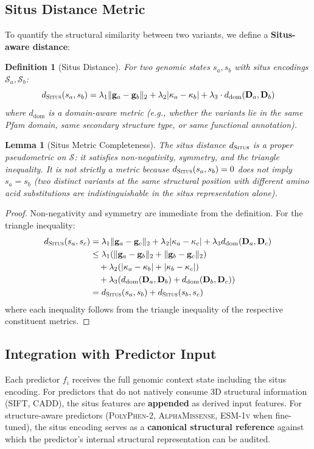 \documentclass[11pt,a4paper]{article}
\newtheorem{lemma}[theorem]{Lemma}
\newtheorem{definition}[theorem]{Definition}
\theoremstyle{definition}
\newcommand{\calS}{\mathcal{S}}
\newcommand{\situs}{\textsc{Situs}}
\newcommand{\SIFT}{\textsc{SIFT}}
\newcommand{\PolyPhen}{\textsc{PolyPhen-2}}
\newcommand{\CADD}{\textsc{CADD}}
\newcommand{\AlphaMissense}{\textsc{AlphaMissense}}
\newcommand{\ESM}{\textsc{ESM-1v}}
\newcommand{\situsenc}{\mathcal{S}}
\begin{document}
\subsection{Situs Distance Metric}
To quantify the structural similarity between two variants, we define a \textbf{Situs-aware distance}:
\begin{definition}[Situs Distance]
For two genomic states $s_a, s_b$ with situs encodings $\situsenc_a, \situsenc_b$:
\begin{equation}
    d_{\situs}(s_a, s_b) = \lambda_1 \|\mathbf{g}_a - \mathbf{g}_b\|_2 + \lambda_2 |\kappa_a - \kappa_b| + \lambda_3 \cdot d_{\text{dom}}(\mathbf{D}_a, \mathbf{D}_b)
\end{equation}
where $d_{\text{dom}}$ is a domain-aware metric (e.g., whether the variants lie in the same Pfam domain, same secondary structure type, or same functional annotation).
\end{definition}
\begin{lemma}[Situs Metric Completeness]
\label{lem:situs-complete}
The situs distance $d_{\situs}$ is a proper pseudometric on $\calS$: it satisfies non-negativity, symmetry, and the triangle inequality.
It is not strictly a metric because $d_{\situs}(s_a, s_b) = 0$ does not imply $s_a = s_b$ (two distinct variants at the same structural position with different amino acid substitutions are indistinguishable in the situs representation alone).
\end{lemma}
\begin{proof}
Non-negativity and symmetry are immediate from the definition.
For the triangle inequality:
\begin{align}
    d_{\situs}(s_a, s_c) &= \lambda_1 \|\mathbf{g}_a - \mathbf{g}_c\|_2 + \lambda_2 |\kappa_a - \kappa_c| + \lambda_3 d_{\text{dom}}(\mathbf{D}_a, \mathbf{D}_c) \\
    &\leq \lambda_1 (\|\mathbf{g}_a - \mathbf{g}_b\|_2 + \|\mathbf{g}_b - \mathbf{g}_c\|_2) \\
    &\quad + \lambda_2 (|\kappa_a - \kappa_b| + |\kappa_b - \kappa_c|) \\
    &\quad + \lambda_3 (d_{\text{dom}}(\mathbf{D}_a, \mathbf{D}_b) + d_{\text{dom}}(\mathbf{D}_b, \mathbf{D}_c)) \\
    &= d_{\situs}(s_a, s_b) + d_{\situs}(s_b, s_c)
\end{align}
where each inequality follows from the triangle inequality of the respective constituent metrics.
\end{proof}
\subsection{Integration with Predictor Input}
Each predictor $f_i$ receives the full genomic context state including the situs encoding.
For predictors that do not natively consume 3D structural information (\SIFT, \CADD), the situs features are \textbf{appended} as derived input features.
For structure-aware predictors (\PolyPhen, \AlphaMissense, \ESM{} when fine-tuned), the situs encoding serves as a \textbf{canonical structural reference} against which the predictor's internal structural representation can be audited.
\end{document}
